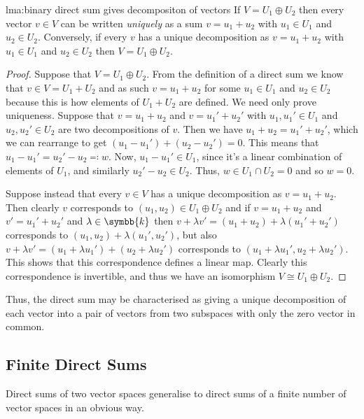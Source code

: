 \documentclass[fleqn]{NotesClass}
\renewcommand{\field}{\symbb{k}}
\newcommand{\isomorphic}{\cong}
\begin{document}
    \begin{lma}{}{lma:binary direct sum gives decompositon of vectors}
        If \(V = U_1 \oplus U_2\) then every vector \(v \in V\) can be written \emph{uniquely} as a sum \(v = u_1 + u_2\) with \(u_1 \in U_1\) and \(u_2 \in U_2\).
        Conversely, if every \(v\) has a unique decomposition as \(v = u_1 + u_2\) with \(u_1 \in U_1\) and \(u_2 \in U_2\) then \(V = U_1 \oplus U_2\).
        \begin{proof}
            Suppose that \(V = U_1 \oplus U_2\).
            From the definition of a direct sum we know that \(v \in V = U_1 + U_2\) and as such \(v = u_1 + u_2\) for some \(u_1 \in U_1\) and \(u_2 \in U_2\) because this is how elements of \(U_1 + U_2\) are defined.
            We need only prove uniqueness.
            Suppose that \(v = u_1 + u_2\) and \(v = u_1' + u_2'\) with \(u_1, u_1' \in U_1\) and \(u_2, u_2' \in U_2\) are two decompositions of \(v\).
            Then we have \(u_1 + u_2 = u_1' + u_2'\), which we can rearrange to get \((u_1 - u_1') + (u_2 - u_2') = 0\).
            This means that \(u_1 - u_1' = u_2' - u_2 \eqqcolon w\).
            Now, \(u_1 - u_1' \in U_1\), since it's a linear combination of elements of \(U_1\), and similarly \(u_2' - u_2 \in U_2\).
            Thus, \(w \in U_1 \cap U_2 = 0\) and so \(w = 0\).
            
            Suppose instead that every \(v \in V\) has a unique decomposition as \(v = u_1 + u_2\).
            Then clearly \(v\) corresponds to \((u_1, u_2) \in U_1 \oplus U_2\) and if \(v = u_1 + u_2\) and \(v' = u_1' + u_2'\) and \(\lambda \in \field\) then \(v + \lambda v' = (u_1 + u_2) + \lambda(u_1' + u_2')\) corresponds to \((u_1, u_2) + \lambda(u_1', u_2')\), but also \(v + \lambda v' = (u_1 + \lambda u_1') + (u_2 + \lambda u_2')\) corresponds to \((u_1 + \lambda u_1', u_2 + \lambda u_2')\).
            This shows that this correspondence defines a linear map.
            Clearly this correspondence is invertible, and thus we have an isomorphism \(V \isomorphic U_1 \oplus U_2\).
        \end{proof}
    \end{lma}
    
    Thus, the direct sum may be characterised as giving a unique decomposition of each vector into a pair of vectors from two subspaces with only the zero vector in common.
    
    \subsection{Finite Direct Sums}
    Direct sums of two vector spaces generalise to direct sums of a finite number of vector spaces in an obvious way.
    
\end{document}
